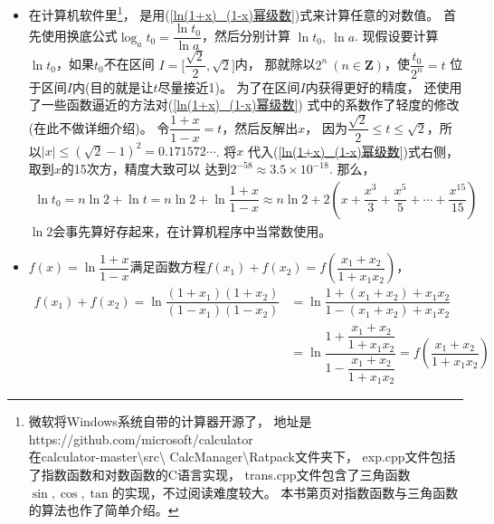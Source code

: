 \begin{itemize}[leftmargin=\inteval{\myitemleftmargin}pt,itemsep=
   \inteval{\myitemitempsep}pt,topsep=\inteval{\myitemtopsep}pt]
不过，上式的精度不如以下的$ (3,3) $阶帕德逼近
\begin{align}\label{lnt帕德近似3_3}
    \ln t \approx&\ \dfrac{11(t-1)^3+60(t-1)^2+60(t-1)}{3(t-1)^3+36(t-1)^2
        +90(t-1)+60} \nonumber \\ 
    =&\ \dfrac{11t^3+27t^2-27t-11}{3(t^3+9t^2+9t+1)}=
    \dfrac{(t-1)(11t^2+38t+11)}{3(t^3+9t^2+9t+1)}
\end{align}
\begin{figure}[!htbp]
    \centering
    \texttt{[image: lnx帕德逼近]}
\end{figure}

\item 在计算机软件里\footnote{微软将Windows系统自带的计算器开源了，
地址是https://github.com/microsoft/calculator \\
在calculator-master\textbackslash src\textbackslash 
CalcManager\textbackslash Ratpack文件夹下，
exp.cpp文件包括了指数函数和对数函数的C语言实现，
trans.cpp文件包含了三角函数$ \sin,\cos,\tan $的实现，不过阅读难度较大。
本书第\pageref{指数函数与三角函数算法}页对指数函数与三角函数的算法也作了简单介绍。}，
是用(\ref{ln(1+x)_(1-x)幂级数})式来计算任意的对数值。
首先使用换底公式$ \log_a t_0=\dfrac{\ln t_0}{\ln a} $，然后分别计算
$ \ln t_0,\ \ln a $. 现假设要计算$ \ln t_0 $，如果$ t_0 $不在区间
$ I= \Big[\dfrac{\sqrt{2}}{2},\sqrt{2}\Big] $内，
那就除以$ 2^n\ (n\in \textbf{Z}) $，使$ \dfrac{t_0}{2^n}=t $
位于区间$ I $内(目的就是让$ t $尽量接近1)。
为了在区间$ I $内获得更好的精度，
还使用了一些函数逼近的方法对(\ref{ln(1+x)_(1-x)幂级数})
式中的系数作了轻度的修改(在此不做详细介绍)。
令$ \dfrac{1+x}{1-x}=t $，然后反解出$ x $，
因为$ \dfrac{\sqrt{2}}{2}\leq t\leq \sqrt{2} $，所以$ |x|\leq 
(\sqrt{2}-1)^2=0.171572\cdots $. 将$ x $
代入(\ref{ln(1+x)_(1-x)幂级数})式右侧，取到$ x $的15次方，精度大致可以
达到$ 2^{-58}\approx 3.5\times10^{-18} $. 那么，
\begin{gather*}
    \ln t_0=n\ln 2+\ln t=n\ln 2+\ln\dfrac{1+x}{1-x}\approx n\ln 2+
    2\left(x+\dfrac{x^3}{3}+\dfrac{x^5}{5}+\cdots+\dfrac{x^{15}}{15}\right)
\end{gather*}
$ \ln 2 $会事先算好存起来，在计算机程序中当常数使用。 

\item $ f(x)=\ln\dfrac{1+x}{1-x} $满足函数方程$ f(x_1)+f(x_2)=
f\left(\dfrac{x_1+x_2}{1+x_1x_2}\right) $，
\begin{align*}
  f(x_1)+f(x_2) =\ln\dfrac{(1+x_1)(1+x_2)}{(1-x_1)(1-x_2)}
    &=\ln\dfrac{1+(x_1+x_2)+x_1x_2}{1-(x_1+x_2)+x_1x_2}\\
    &=\ln\dfrac{1+\dfrac{x_1+x_2}{1+x_1x_2}}{1-\dfrac{x_1+x_2}{1+x_1x_2}}=
    f\left(\dfrac{x_1+x_2}{1+x_1x_2}\right) 
\end{align*}


\end{itemize}
